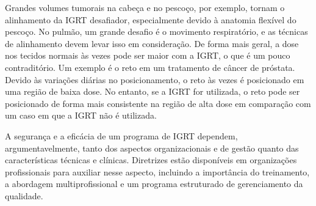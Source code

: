 \documentclass[11pt,a4paper]{article}
\newcounter{exemplo}
\begin{document}
	Grandes volumes tumorais na cabeça e no pescoço, por exemplo, tornam o alinhamento da IGRT desafiador, especialmente devido à anatomia flexível do pescoço. No pulmão, um grande desafio é o movimento respiratório, e as técnicas de alinhamento devem levar isso em consideração. De forma mais geral, a dose nos tecidos normais às vezes pode ser maior com a IGRT, o que é um pouco contraditório. Um exemplo é o reto em um tratamento de câncer de próstata. Devido às variações diárias no posicionamento, o reto às vezes é posicionado em uma região de baixa dose. No entanto, se a IGRT for utilizada, o reto pode ser posicionado de forma mais consistente na região de alta dose em comparação com um caso em que a IGRT não é utilizada.

	A segurança e a eficácia de um programa de IGRT dependem, argumentavelmente, tanto dos aspectos organizacionais e de gestão quanto das características técnicas e clínicas. Diretrizes estão disponíveis em organizações profissionais para auxiliar nesse aspecto, incluindo a importância do treinamento, a abordagem multiprofissional e um programa estruturado de gerenciamento da qualidade.


\end{document}
